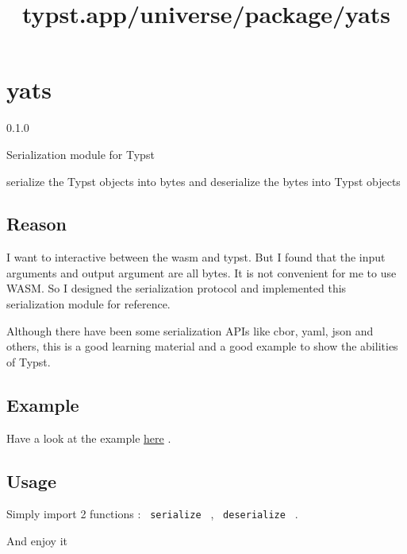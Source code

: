 \title{typst.app/universe/package/yats}

\label{banner}
\section{yats}\label{yats}

{ 0.1.0 }

Serialization module for Typst

\label{readme}
serialize the Typst objects into bytes and deserialize the bytes into
Typst objects

\subsection{Reason}\label{reason}

I want to interactive between the wasm and typst. But I found that the
input arguments and output argument are all bytes. It is not convenient
for me to use WASM. So I designed the serialization protocol and
implemented this serialization module for reference.

Although there have been some serialization APIs like cbor, yaml, json
and others, this is a good learning material and a good example to show
the abilities of Typst.

\subsection{Example}\label{example}

Have a look at the example
\href{https://github.com/typst/packages/raw/main/packages/preview/yats/0.1.0/example.typ}{here}
.

\subsection{Usage}\label{usage}

Simply import 2 functions : \texttt{\ serialize\ } ,
\texttt{\ deserialize\ } .

And enjoy it

\begin{Shaded}
\begin{Highlighting}[]
\NormalTok{\#\{}
\NormalTok{  )}
\NormalTok{\}}
\end{Highlighting}
\end{Shaded}

